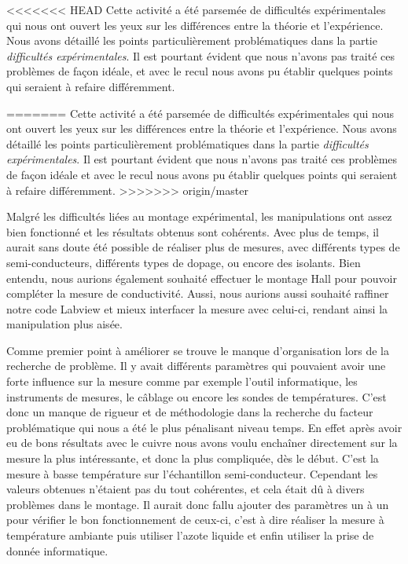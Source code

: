 <<<<<<< HEAD
Cette activité a été parsemée de difficultés expérimentales qui nous ont ouvert les yeux sur les différences entre la théorie et l'expérience. Nous avons détaillé les points particulièrement problématiques dans la partie \emph{difficultés expérimentales}. Il est pourtant évident que nous n'avons pas traité ces problèmes de façon idéale, et avec le recul nous avons pu établir quelques points qui seraient à refaire différemment.

\bigskip
=======
Cette activité a été parsemée de difficultés expérimentales qui nous ont ouvert les yeux sur les différences entre la théorie et l'expérience. Nous avons détaillé les points particulièrement problématiques dans la partie \emph{difficultés expérimentales}. Il est pourtant évident que nous n'avons pas traité ces problèmes de façon idéale et avec le recul nous avons pu établir quelques points qui seraient à refaire différemment.
>>>>>>> origin/master

Malgré les difficultés liées au montage expérimental, les manipulations ont assez bien fonctionné et les résultats obtenus sont cohérents.
Avec plus de temps, il aurait sans doute été possible de réaliser plus de mesures, avec différents types de semi-conducteurs, différents types de dopage, ou encore des isolants.
Bien entendu, nous aurions également souhaité effectuer le montage Hall pour pouvoir compléter la mesure de conductivité.
Aussi, nous aurions aussi souhaité raffiner notre code Labview et mieux interfacer la mesure avec celui-ci, rendant ainsi la manipulation plus aisée.

\bigskip

Comme premier point à améliorer se trouve le manque d'organisation lors de la recherche de problème. Il y avait différents paramètres qui pouvaient avoir une forte influence sur la mesure comme par exemple l'outil informatique, les instruments de mesures, le câblage ou encore les sondes de températures. C'est donc un manque de rigueur et de méthodologie dans la recherche du facteur problématique qui nous a été le plus pénalisant niveau temps. En effet après avoir eu de bons résultats avec le cuivre nous avons voulu enchaîner directement sur la mesure la plus intéressante, et donc la plus compliquée, dès le début. C'est la mesure à basse température sur l'échantillon semi-conducteur. Cependant les valeurs obtenues n'étaient pas du tout cohérentes, et cela était dû à divers problèmes dans le montage. Il aurait donc fallu ajouter des paramètres un à un pour vérifier le bon fonctionnement de ceux-ci, c'est à dire réaliser la mesure à température ambiante puis utiliser l'azote liquide et enfin utiliser la prise de donnée informatique. 

